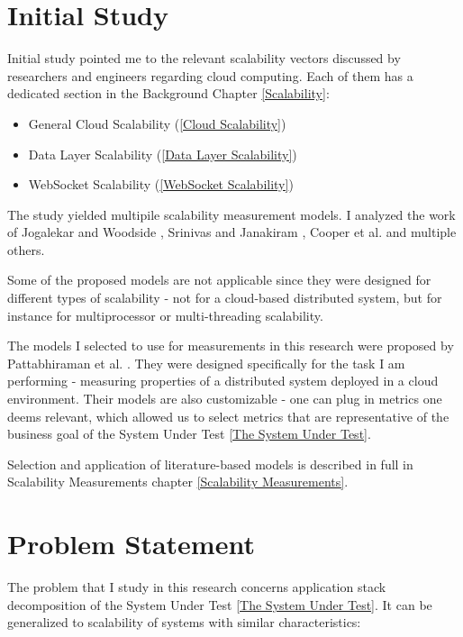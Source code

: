 \documentclass{uvamscse}
\begin{document}
\section{Initial Study}

Initial study pointed me to the relevant scalability vectors discussed by researchers and engineers regarding cloud computing. Each of them has a dedicated section in the Background Chapter \ref{Scalability}:

\begin{itemize}
  \item General Cloud Scalability (\ref{Cloud Scalability})
  \item Data Layer Scalability (\ref{Data Layer Scalability})
  \item WebSocket Scalability (\ref{WebSocket Scalability})
\end{itemize}

The study yielded multipile scalability measurement models. I analyzed the work of Jogalekar and Woodside \cite{EvaScaDS}, Srinivas and Janakiram \cite{SriJan}, Cooper et al. \cite{Ycsb} and multiple others.

Some of the proposed models are not applicable since they were designed for different types of scalability - not for a cloud-based distributed system, but for instance for multiprocessor or multi-threading scalability.

The models I selected to use for measurements in this research were proposed by Pattabhiraman et al. \cite{Models}. They were designed specifically for the task I am performing - measuring properties of a distributed system deployed in a cloud environment. Their models are also customizable - one can plug in metrics one deems relevant, which allowed us to select metrics that are representative of the business goal of the System Under Test \ref{The System Under Test}.

Selection and application of literature-based models is described in full in Scalability Measurements chapter \ref{Scalability Measurements}.

\section{Problem Statement}\label{Problem Statement}

The problem that I study in this research concerns application stack decomposition of the System Under Test \ref{The System Under Test}. It can be generalized to scalability of systems with similar characteristics:
\end{document}

